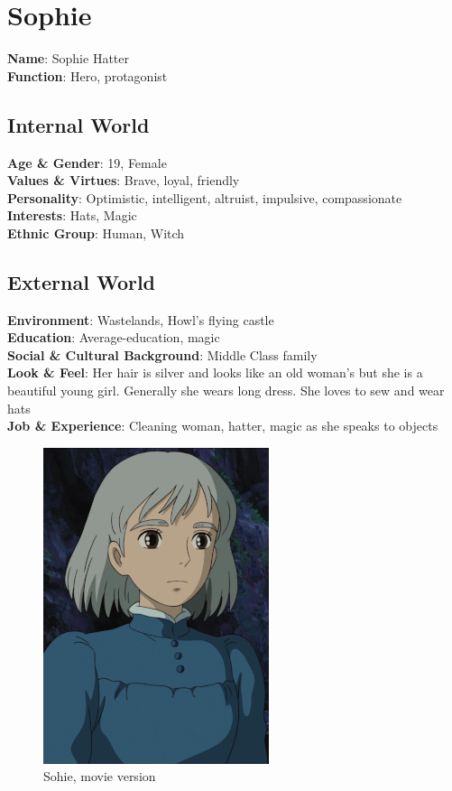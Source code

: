 \section{Sophie}

\begin{minipage}{0.5\textwidth}
\textbf{Name}: Sophie Hatter \\
\textbf{Function}: Hero, protagonist

\subsection{Internal World}

\textbf{Age \& Gender}: 19, Female \\
\textbf{Values \& Virtues}: Brave, loyal, friendly \\
\textbf{Personality}: Optimistic, intelligent, altruist, impulsive, compassionate \\
\textbf{Interests}: Hats, Magic \\
\textbf{Ethnic Group}: Human, Witch

\subsection{External World}
\textbf{Environment}: Wastelands, Howl’s flying castle \\
\textbf{Education}: Average-education, magic \\
\textbf{Social \& Cultural Background}: Middle Class family \\
\textbf{Look \& Feel}: Her hair is silver and looks like an old woman's but she is a beautiful young girl. Generally she wears long dress. She loves to sew and wear hats \\
\textbf{Job \& Experience}: Cleaning woman, hatter, magic as she speaks to objects \\

\end{minipage}%
%
\hfill\begin{minipage}{0.4\textwidth}
\begin{figure}[H]
  \includegraphics{Images/Characters/sophie}
  \caption{Sohie, movie version}
  \end{figure}
\end{minipage}

